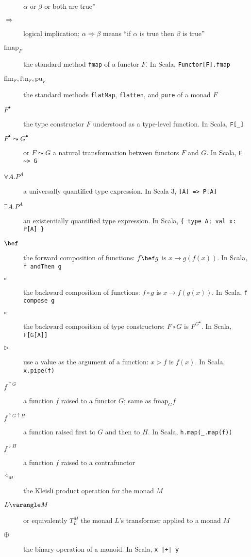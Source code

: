 \begin{description}
$\alpha$ or $\beta$ or both are true\textsf{''}
\item [{$\Rightarrow$}] logical implication; $\alpha\Rightarrow\beta$
means \textsf{``}if $\alpha$ is true then $\beta$ is true\textsf{''}
\item [{$\text{fmap}_{F}$}] the standard method \lstinline!fmap! of a
functor $F$. In Scala, \lstinline!Functor[F].fmap!
\item [{$\text{flm}_{F},\text{ftn}_{F},\text{pu}_{F}$}] the standard methods
\lstinline!flatMap!, \lstinline!flatten!, and \lstinline!pure!
of a monad $F$
\item [{$F^{\bullet}$}] the type constructor $F$ understood as a type-level
function. In Scala, \lstinline!F[_]! 
\item [{$F^{\bullet}\leadsto G^{\bullet}$}] or $F\leadsto G$ a natural
transformation between functors $F$ and $G$. In Scala, \lstinline!F ~> G!
\item [{$\forall A.P^{A}$}] a universally quantified type expression.
In Scala 3, \lstinline![A] => P[A]!
\item [{$\exists A.P^{A}$}] an existentially quantified type expression.
In Scala, \lstinline!{ type A; val x: P[A] }! 
\item [{$\bef$}] the forward composition of functions: $f\bef g$ is $x\rightarrow g(f(x))$.
In Scala, \lstinline!f andThen g!
\item [{$\circ$}] the backward composition of functions: $f\circ g$ is
$x\rightarrow f(g(x))$. In Scala, \lstinline!f compose g!
\item [{$\circ$}] the backward composition of type constructors: $F\circ G$
is $F^{G^{\bullet}}$. In Scala, \lstinline!F[G[A]]! 
\item [{$\triangleright$}] use a value as the argument of a function:
$x\triangleright f$ is $f(x)$. In Scala, \lstinline!x.pipe(f)!
\item [{$f^{\uparrow G}$}] a function $f$ raised to a functor $G$; same
as $\text{fmap}_{G}f$
\item [{$f^{\uparrow G\uparrow H}$}] a function raised first to $G$ and
then to $H$. In Scala, \lstinline!h.map(_.map(f))! 
\item [{$f^{\downarrow H}$}] a function $f$ raised to a contrafunctor 
\item [{$\diamond_{M}$}] the Kleisli product operation for the monad $M$
\item [{$L\varangle M$}] or equivalently $T_{L}^{M}$ \textemdash{} the
monad $L$\textsf{'}s transformer applied to a monad $M$
\item [{$\oplus$}] the binary operation of a monoid. In Scala, \lstinline!x |+| y!

\end{description}
